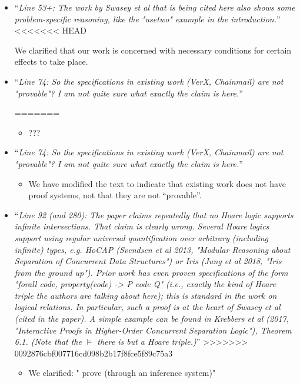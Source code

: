 \documentclass[11pt]{amsart}
\begin{document}
\begin{itemize}
\begin{itemize}
\item
``\emph{Line 53+: The work by Swasey et al that is being cited here also shows some problem-specific reasoning, like the "usetwo" example in the introduction.}''
<<<<<<< HEAD

We clarified that our work is concerned with necessary conditions for certain effects to take place. 
\item
``\emph{Line 74: So the specifications in existing work (VerX, Chainmail) are not "provable"? I am not quite sure what exactly the claim is here.}''

=======
\begin{itemize}
\item
???
\end{itemize}

\item
``\emph{Line 74: So the specifications in existing work (VerX, Chainmail) are not "provable"? I am not quite sure what exactly the claim is here.}''
\begin{itemize}
\item
We have modified the text to indicate that existing work does not have proof systems, not that they are not ``provable''.
\end{itemize}

\item
``\emph{Line 92 (and 280): The paper claims repeatedly that no Hoare logic supports infinite intersections. That claim is clearly wrong. Several Hoare logics support using regular universal quantification over arbitrary (including infinite) types, e.g. HoCAP (Svendsen et al 2013, "Modular Reasoning about Separation of Concurrent Data Structures") or Iris (Jung et al 2018, "Iris from the ground up"). Prior work has even proven specifications of the form "forall code, property(code) -> {P} code {Q}" (i.e., exactly the kind of Hoare triple the authors are talking about here); this is standard in the work on logical relations. In particular, such a proof is at the heart of Swasey et al (cited in the paper). A simple example can be found in Krebbers et al (2017, "Interactive Proofs in Higher-Order Concurrent Separation Logic"), Theorem 6.1. (Note that the $\vDash$ there is but a Hoare triple.)}''
>>>>>>> 0092876cbf007716cd098b2b17f8fce5f89c75a3
\begin{itemize}
\item
We clarified: " prove
(through an inference system)"
\end{itemize}


\end{itemize}
\end{itemize}
\end{document}
